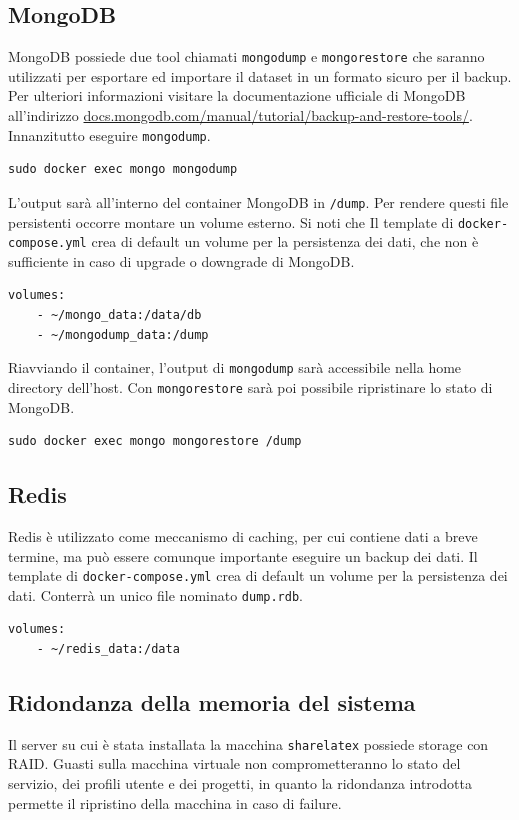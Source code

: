 \subsection{MongoDB}
MongoDB possiede due tool chiamati \verb|mongodump| e \verb|mongorestore| che saranno utilizzati per esportare ed importare il dataset in un formato sicuro per il backup. Per ulteriori informazioni visitare la documentazione ufficiale di MongoDB all'indirizzo \url{docs.mongodb.com/manual/tutorial/backup-and-restore-tools/}. Innanzitutto eseguire \verb|mongodump|.
\begin{lstlisting}
sudo docker exec mongo mongodump
\end{lstlisting}
L'output sarà all'interno del container MongoDB in \verb|/dump|. Per rendere questi file persistenti occorre montare un volume esterno. Si noti che Il template di \verb|docker-compose.yml| crea di default un volume per la persistenza dei dati, che non è sufficiente in caso di upgrade o downgrade di MongoDB.
\begin{lstlisting}
volumes:
    - ~/mongo_data:/data/db
    - ~/mongodump_data:/dump
\end{lstlisting}
Riavviando il container, l'output di \verb|mongodump| sarà accessibile nella home directory dell'host. Con \verb|mongorestore| sarà poi possibile ripristinare lo stato di MongoDB.
\begin{lstlisting}
sudo docker exec mongo mongorestore /dump
\end{lstlisting}

\subsection{Redis}
Redis è utilizzato come meccanismo di caching, per cui contiene dati a breve termine, ma può essere comunque importante eseguire un backup dei dati. Il template di \verb|docker-compose.yml| crea di default un volume per la persistenza dei dati. Conterrà un unico file nominato \verb|dump.rdb|.
\begin{lstlisting}
volumes:
    - ~/redis_data:/data
\end{lstlisting} 

\subsection{Ridondanza della memoria del sistema}
Il server su cui è stata installata la macchina \verb|sharelatex| possiede storage con RAID. Guasti sulla macchina virtuale non comprometteranno lo stato del servizio, dei profili utente e dei progetti, in quanto la ridondanza introdotta permette il ripristino della macchina in caso di failure.

